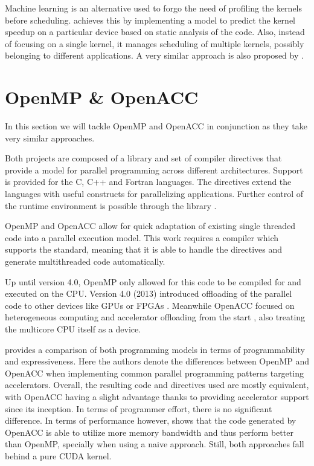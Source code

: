 Machine learning is an alternative used to forgo the need of profiling the kernels before scheduling. \cite{smart_multitasking_scheduling} achieves this by implementing a model to predict the kernel speedup on a particular device based on static analysis of the code. Also, instead of focusing on a single kernel, it manages scheduling of multiple kernels, possibly belonging to different applications. A very similar approach is also proposed by \cite{load_balance_model_opencl_integrated_cluster}.

\section{OpenMP \& OpenACC}
In this section we will tackle OpenMP and OpenACC in conjunction as they take very similar approaches.

Both projects are composed of a library and set of compiler directives that provide a model for parallel programming across different architectures. Support is provided for the C, C++ and Fortran languages. The directives extend the languages with useful constructs for parallelizing applications. Further control of the runtime environment is possible through the library \cite{openmp_spec} \cite{openacc_spec}.

OpenMP and OpenACC allow for quick adaptation of existing single threaded code into a parallel execution model. This work requires a compiler which supports the standard, meaning that it is able to handle the directives and generate multithreaded code automatically. 

Up until version 4.0, OpenMP only allowed for this code to be compiled for and executed on the CPU. Version 4.0 (2013) introduced offloading of the parallel code to other devices like GPUs or FPGAs \cite{openmp_gpu_support}. Meanwhile OpenACC focused on heterogeneous computing and accelerator offloading from the start \cite{openacc_initial_spec}, also treating the multicore CPU itself as a device.

\cite{openmp_vs_openacc} provides a comparison of both programming models in terms of programmability and expressiveness. Here the authors denote the differences between OpenMP and OpenACC when implementing common parallel programming patterns targeting accelerators. Overall, the resulting code and directives used are mostly equivalent, with OpenACC having a slight advantage thanks to providing accelerator support since its inception. In terms of programmer effort, there is no significant difference. In terms of performance however, \cite{cuda_openacc_openmp_performance} shows that the code generated by OpenACC is able to utilize more memory bandwidth and thus perform better than OpenMP, specially when using a naive approach. Still, both approaches fall behind a pure CUDA kernel.

